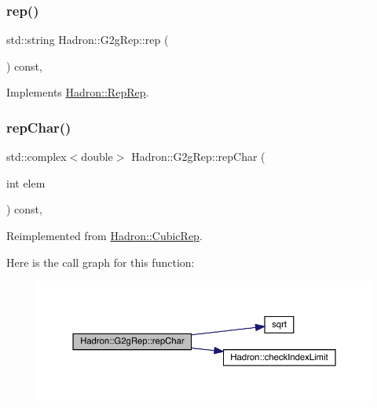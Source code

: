 \mbox{\label{structHadron_1_1G2gRep_a18380ef621e1c6761e5a8b3ff7170f87}} 
\subsubsection{\texorpdfstring{rep()}{rep()}\hspace{0.1cm}{\footnotesize\ttfamily [3/3]}}
{\footnotesize\ttfamily std\+::string Hadron\+::\+G2g\+Rep\+::rep (\begin{DoxyParamCaption}{ }\end{DoxyParamCaption}) const\hspace{0.3cm}{\ttfamily [inline]}, {\ttfamily [virtual]}}



Implements \mbox{\hyperlink{structHadron_1_1RepRep_ab3213025f6de249f7095892109575fde}{Hadron\+::\+Rep\+Rep}}.

\mbox{\label{structHadron_1_1G2gRep_ab31419c7383dac18c56c70f3ca7220a9}} 
\subsubsection{\texorpdfstring{repChar()}{repChar()}\hspace{0.1cm}{\footnotesize\ttfamily [1/2]}}
{\footnotesize\ttfamily std\+::complex$<$double$>$ Hadron\+::\+G2g\+Rep\+::rep\+Char (\begin{DoxyParamCaption}\item[{int}]{elem }\end{DoxyParamCaption}) const\hspace{0.3cm}{\ttfamily [inline]}, {\ttfamily [virtual]}}



Reimplemented from \mbox{\hyperlink{structHadron_1_1CubicRep_af45227106e8e715e84b0af69cd3b36f8}{Hadron\+::\+Cubic\+Rep}}.

Here is the call graph for this function\+:
\nopagebreak
\begin{figure}[H]
\begin{center}
\leavevmode
\includegraphics[width=350pt]{d9/d3e/structHadron_1_1G2gRep_ab31419c7383dac18c56c70f3ca7220a9_cgraph}
\end{center}
\end{figure}
\mbox{\label{structHadron_1_1G2gRep_ab31419c7383dac18c56c70f3ca7220a9}} 
